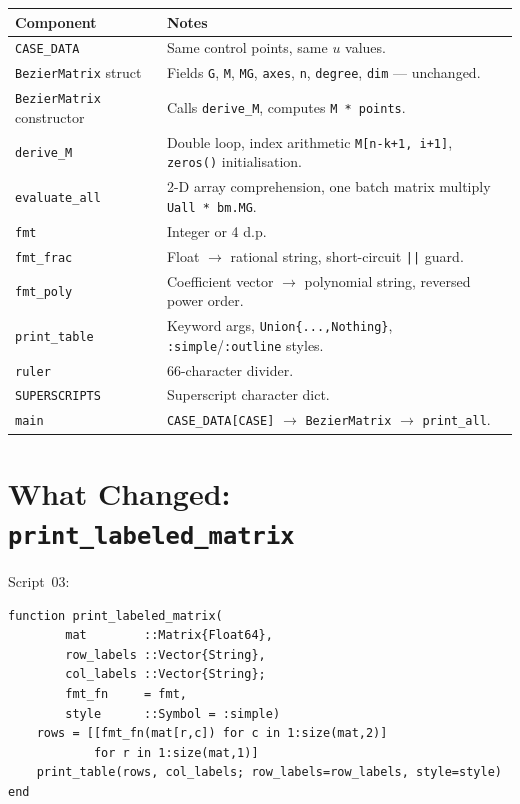 \documentclass[12pt, a4paper]{article}
\newcommand{\cd}[1]{\texttt{#1}}
\begin{document}
\begin{samebox}
\begin{tabular}{lp{9cm}}
\toprule
Component & Notes \\
\midrule
\cd{CASE\_DATA} & Same control points, same $u$ values. \\
\cd{BezierMatrix} struct & Fields \cd{G}, \cd{M}, \cd{MG},
  \cd{axes}, \cd{n}, \cd{degree}, \cd{dim} --- unchanged. \\
\cd{BezierMatrix} constructor & Calls \cd{derive\_M},
  computes \cd{M * points}. \\
\cd{derive\_M} & Double loop, index arithmetic
  \cd{M[n-k+1, i+1]}, \cd{zeros()} initialisation. \\
\cd{evaluate\_all} & 2-D array comprehension,
  one batch matrix multiply \cd{Uall * bm.MG}. \\
\cd{fmt} & Integer or 4 d.p. \\
\cd{fmt\_frac} & Float $\to$ rational string,
  short-circuit \cd{||} guard. \\
\cd{fmt\_poly} & Coefficient vector $\to$ polynomial string,
  reversed power order. \\
\cd{print\_table} & Keyword args, \cd{Union\{...,Nothing\}},
  \cd{:simple}/\cd{:outline} styles. \\
\cd{ruler} & 66-character divider. \\
\cd{SUPERSCRIPTS} & Superscript character dict. \\
\cd{main} & \cd{CASE\_DATA[CASE]} $\to$ \cd{BezierMatrix}
  $\to$ \cd{print\_all}. \\
\bottomrule
\end{tabular}
\end{samebox}


\section{What Changed: \texttt{print\_labeled\_matrix}}

Script~03:
\begin{verbatim}
function print_labeled_matrix(
        mat        ::Matrix{Float64},
        row_labels ::Vector{String},
        col_labels ::Vector{String};
        fmt_fn     = fmt,
        style      ::Symbol = :simple)
    rows = [[fmt_fn(mat[r,c]) for c in 1:size(mat,2)]
            for r in 1:size(mat,1)]
    print_table(rows, col_labels; row_labels=row_labels, style=style)
end
\end{verbatim}
\end{document}
